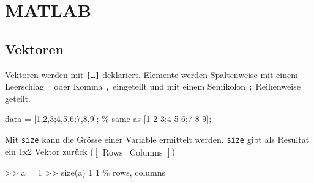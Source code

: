 \documentclass[
  10pt,
  a4paper,
  german]{article}
\newenvironment{Shaded}{}{}
\newcommand{\CommentTok}[1]{\textcolor[rgb]{0.42,0.45,0.49}{#1}}
\newcommand{\FloatTok}[1]{\textcolor[rgb]{0.00,0.36,0.77}{#1}}
\newcommand{\NormalTok}[1]{\textcolor[rgb]{0.14,0.16,0.18}{#1}}
\newcommand{\OperatorTok}[1]{\textcolor[rgb]{0.14,0.16,0.18}{#1}}
\newcommand{\VariableTok}[1]{\textcolor[rgb]{0.89,0.38,0.04}{#1}}
\numberwithin{equation}{section}
\begin{document}
\begin{multicols}{2}
\begin{tcolorbox}
\end{tcolorbox}

\hypertarget{matlab}{%
\section{MATLAB}\label{matlab}}

\hypertarget{vektoren}{%
\subsection{Vektoren}\label{vektoren}}

Vektoren werden mit \texttt{{[}…{]}} deklariert. Elemente werden
Spaltenweise mit einem Leerschlag
\texttt{\textquotesingle{}\ \textquotesingle{}} oder Komma \texttt{,}
eingeteilt und mit einem Semikolon \texttt{;} Reihenweise geteilt.

\begin{Shaded}
\begin{Highlighting}[]
\VariableTok{data} \OperatorTok{=}\NormalTok{ [}\FloatTok{1}\OperatorTok{,}\FloatTok{2}\OperatorTok{,}\FloatTok{3}\OperatorTok{;}\FloatTok{4}\OperatorTok{,}\FloatTok{5}\OperatorTok{,}\FloatTok{6}\OperatorTok{;}\FloatTok{7}\OperatorTok{,}\FloatTok{8}\OperatorTok{,}\FloatTok{9}\NormalTok{]}\OperatorTok{;} \CommentTok{\% same as [1 2 3;4 5 6;7 8 9];}
\end{Highlighting}
\end{Shaded}

\begin{tcolorbox}[enhanced jigsaw, rightrule=.15mm, toprule=.15mm, leftrule=.75mm, opacityback=0, title=\textcolor{quarto-callout-note-color}{\faInfo}\hspace{0.5em}{Grösse \texttt{size}}, opacitybacktitle=0.6, colback=white, arc=.35mm, bottomrule=.15mm, colframe=quarto-callout-note-color-frame, coltitle=black, bottomtitle=1mm, left=2mm, toptitle=1mm, breakable, titlerule=0mm, colbacktitle=quarto-callout-note-color!10!white]

Mit \texttt{size} kann die Grösse einer Variable ermittelt werden.
\texttt{size} gibt als Resultat ein 1x2 Vektor zurück
(\(\begin{bmatrix}\text{Rows} & \text{Columns}\end{bmatrix}\))

\begin{Shaded}
\begin{Highlighting}[]
\OperatorTok{\textgreater{}\textgreater{}} \VariableTok{a} \OperatorTok{=} \FloatTok{1}
\OperatorTok{\textgreater{}\textgreater{}} \VariableTok{size}\NormalTok{(}\VariableTok{a}\NormalTok{)}
     \FloatTok{1}     \FloatTok{1}  \CommentTok{\% rows, columns}
\end{Highlighting}
\end{Shaded}


\end{tcolorbox}
\end{multicols}
\end{document}
